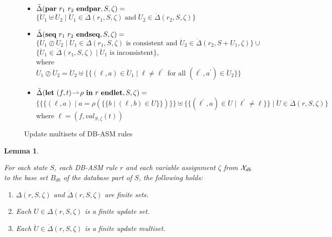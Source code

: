 \documentclass[preprint,11pt]{elsarticle}
\newtheorem{lemma}[theorem]{Lemma}
\theoremstyle{definition}
\theoremstyle{remark}
\begin{document}
\begin{figure}[h!]
{{\begin{itemize}
\item
$\ddot{\Delta}(\text{\textbf{par} }r_1 \text{ } r_2\text{
\textbf{endpar}},S,\zeta) =$\\
\hspace*{4.2cm} $\{ \ddot{U}_1 \uplus\ddot{U}_2
\mid \ddot{U}_1 \in \ddot{\Delta}(r_1,S,\zeta) \; \text{and} \; \ddot{U}_2 \in
\ddot{\Delta}(r_2,S,\zeta)\}$\\

\item
$\ddot{\Delta}(\text{\textbf{seq} }r_1 \text{ } r_2 \text{
\textbf{endseq}},S,\zeta) =$\\
\hspace*{1cm} $\{ \ddot{U}_1 \oslash
\ddot{U}_2 \mid \ddot{U}_1 \in \ddot{\Delta}(r_1,S,\zeta)
\text{ is consistent and }\ddot{U}_2 \in
\ddot{\Delta}(r_2,S+U_1,\zeta)\} \cup$ \\
\hspace*{1cm} $\{\ddot{U}_1 \in \ddot{\Delta}(r_1,S,\zeta) \mid \ddot{U}_1 \text{ is inconsistent} \}$, \\
\hspace*{1cm} where $\ddot{U}_1 \oslash \ddot{U}_2 =
\ddot{U}_2 \uplus \{\!\!\{ (\ell,a) \in \ddot{U}_1 \mid \ell \neq \ell^\prime \text{ for all } (\ell^\prime,a^\prime) \in \ddot{U}_2 \}\!\!\}$\\


\item
$\ddot{\Delta}(\text{\textbf{let} }(f,t)\!\rightharpoonup\!\rho \text{
\textbf{in} }r\text{ \textbf{endlet}},S,\zeta) =$\\
$\{ \{\!\!\{ (\ell,a)
\mid a = \rho( \{\!\!\{ b \mid (\ell,b) \in
\ddot{U}\}\!\!\} ) \}\!\!\} \uplus
\{\!\!\{ (\ell^\prime,a) \in \ddot{U} \mid \ell^\prime \neq \ell \}\!\!\} \mid \ddot{U}\in \ddot{\Delta}(r,S,\zeta)\}$
\hspace{6.3cm}where $\ell = (f, val_{S,\zeta}(t))$

\end{itemize}}}\caption{Update multisets of DB-ASM rules}\label{fig:multiset}
\end{figure}






\begin{lemma}\label{lem-finiteness}

For each state $S$, each DB-ASM rule $r$ and each variable assignment $\zeta$ from ${\cal X}_{db}$ to the base set $B_{db}$ of the database part of $S$, the following holds:

\begin{enumerate}

\item $\Delta(r,S,\zeta)$ and $\ddot{\Delta}(r,S,\zeta)$ are finite sets.

\item Each $U \in \Delta(r,S,\zeta)$ is a finite update set.

\item Each $\ddot{U} \in \ddot{\Delta}(r,S,\zeta)$ is a finite update multiset.

\end{enumerate}

\end{lemma}
\end{document}

